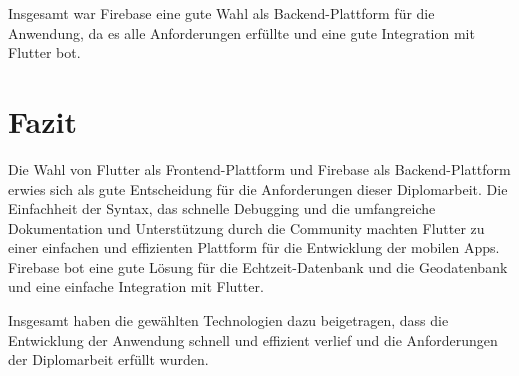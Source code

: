 Insgesamt war Firebase eine gute Wahl als Backend-Plattform für die Anwendung, da es alle Anforderungen erfüllte und eine gute Integration mit Flutter bot.

\section{Fazit}

Die Wahl von Flutter als Frontend-Plattform und Firebase als Backend-Plattform erwies sich als gute Entscheidung für die Anforderungen dieser Diplomarbeit. Die Einfachheit der Syntax, das schnelle Debugging und die umfangreiche Dokumentation und Unterstützung durch die Community machten Flutter zu einer einfachen und effizienten Plattform für die Entwicklung der mobilen Apps. Firebase bot eine gute Lösung für die Echtzeit-Datenbank und die Geodatenbank und eine einfache Integration mit Flutter.

Insgesamt haben die gewählten Technologien dazu beigetragen, dass die Entwicklung der Anwendung schnell und effizient verlief und die Anforderungen der Diplomarbeit erfüllt wurden.

